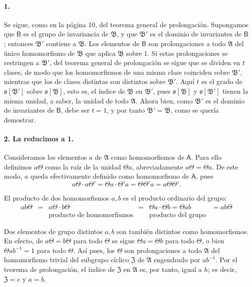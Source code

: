 \paragraph{1.}
Se sigue, como en la página 10, del teorema general de prolongación. Supongamos que \(\mathsf B\) es el grupo de invariancia de \(\mathfrak B\), y que \(\mathfrak B'\) es el dominio de invariantes de \(\mathsf B\); entonces \(\mathfrak B'\) contiene a \(\mathfrak B\). Los elementos de \(\mathsf B\) son prolongaciones a todo \(\mathfrak A\) del único homomorfismo de \(\mathfrak B\) que aplica \(\mathfrak B\) sobre \(1\). Si estas prolongaciones se restringen a \(\mathfrak B'\), del teorema general de prolongación se sigue que se dividen en \(t\) clases, de modo que los homomorfismos de una misma clase coinciden sobre \(\mathfrak B'\), mientras que los de clases distintas son distintos sobre \(\mathfrak B'\). Aquí \(t\) es el grado de \(\mathfrak o[\mathfrak B']\) sobre \(\mathfrak o[\mathfrak B]\), esto es, el índice de \(\mathfrak B\) en \(\mathfrak B'\), pues \(\mathfrak o[\mathfrak B]\) y \(\mathfrak o[\mathfrak B']\) tienen la misma unidad, a saber, la unidad de todo \(\mathfrak A\). Ahora bien, como \(\mathfrak B'\) es el dominio de invariantes de \(\mathsf B\), debe ser \(t=1\), y por tanto \(\mathfrak B'=\mathfrak B\), como se quería demostrar.

\paragraph{2. La reducimos a 1.}

Consideramos los elementos \(a\) de \(\mathfrak A\) como homomorfismos de \(\mathsf A\). Para ello definimos \(a\Theta\) como la raíz de la unidad \(\Theta a\), abreviadamente \(a\Theta=\Theta a\). De este modo, \(a\) queda efectivamente definido como homomorfismo de \(\mathsf A\), pues
\[
a\Theta\cdot a\Theta'=\Theta a\cdot\Theta' a=\Theta\Theta' a=a\Theta\Theta'.
\]

El producto de dos homomorfismos \(a,b\) es el producto ordinario del grupo:
\[
\begin{array}{cccccc}
ab\Theta&=&a\Theta\cdot b\Theta&=&\Theta a\cdot\Theta b=\Theta ab&=ab\Theta\\
&&\text{producto de homomorfismos}&&\text{producto del grupo}&
\end{array}
\]

Dos elementos de grupo distintos \(a,b\) son también distintos como homomorfismos. En efecto, de \(a\Theta=b\Theta\) para todo \(\Theta\) se sigue \(\Theta a=\Theta b\) para todo \(\Theta\), o bien \(\Theta ab^{-1}=1\) para todo \(\Theta\). Así pues, los \(\Theta\) son prolongaciones a todo \(\mathfrak A\) del homomorfismo trivial del subgrupo cíclico \(\mathfrak Z\) de \(\mathfrak A\) engendrado por \(ab^{-1}\). Por el teorema de prolongación, el índice de \(\mathfrak Z\) en \(\mathfrak A\) es, por tanto, igual a \(h\); es decir, \(\mathfrak Z=e\) y \(a=b\).

